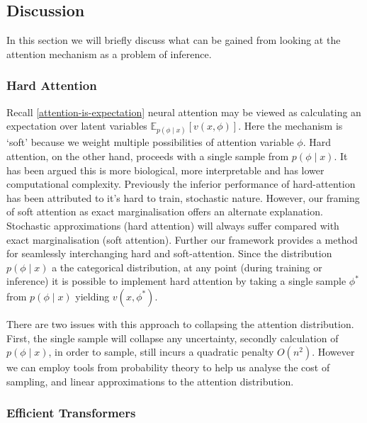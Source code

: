 \documentclass{article}
\theoremstyle{plain}
\theoremstyle{definition}
\theoremstyle{remark}
\begin{document}
\subsection{Discussion}

In this section we will briefly discuss what can be gained from looking at the attention mechanism as a problem of inference.


\subsubsection{Hard Attention}


Recall \eqref{attention-is-expectation} neural attention may be viewed as calculating an expectation over latent variables $\mathbb{E}_{p(\phi \mid x)}[v(x, \phi)]$. Here the mechanism is `soft' because we weight multiple possibilities of attention variable $\phi$. Hard attention, on the other hand, proceeds with a single sample from $p(\phi \mid x)$. It has been argued this is more biological, more interpretable and has lower computational complexity. Previously the inferior performance of hard-attention has been attributed to it's hard to train, stochastic nature. However, our framing of soft attention as exact marginalisation offers an alternate explanation. Stochastic approximations (hard attention) will always suffer compared with exact marginalisation (soft attention). Further our framework provides a method for seamlessly interchanging hard and soft-attention. Since the distribution $p(\phi \mid x)$ a the categorical distribution, at any point (during training or inference) it is possible to implement hard attention by taking a single sample $\phi^*$ from $p(\phi \mid x)$ yielding $v(x, \phi^*)$. 

There are two issues with this approach to collapsing the attention distribution. First, the single sample will collapse any uncertainty, secondly calculation of $p(\phi \mid x)$, in order to sample, still incurs a quadratic penalty $O(n^2)$. However we can employ tools from probability theory to help us analyse the cost of sampling, and linear approximations to the attention distribution.



\subsubsection{Efficient Transformers}
\end{document}
